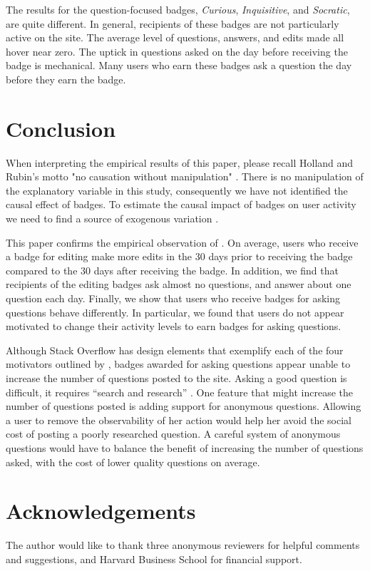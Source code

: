 \documentclass[conference]{IEEEtran}
\newcommand{\1}{\mathds{1}}
\begin{document}
The results for the question-focused badges, \textit{Curious}, \textit{Inquisitive}, and \textit{Socratic}, are quite different. In general, recipients of these badges are not particularly active on the site. The average level of questions, answers, and edits made all hover near zero. The uptick in questions asked on the day before receiving the badge is mechanical. Many users who earn these badges ask a question the day before they earn the badge.

\vspace{0.25in}

\section{Conclusion}

When interpreting the empirical results of this paper, please recall Holland and Rubin's motto "no causation without manipulation" \citep{Holland1986}. There is no manipulation of the explanatory variable in this study, consequently we have not identified the causal effect of badges. To estimate the causal impact of badges on user activity we need to find a source of exogenous variation \citep{Miller2013}.

This paper confirms the empirical observation of \citet{Grant2013}. On average, users who receive a badge for editing make more edits in the 30 days prior to receiving the badge compared to the 30 days after receiving the badge. In addition, we find that recipients of the editing badges ask almost no questions, and answer about one question each day. Finally, we show that users who receive badges for asking questions behave differently. In particular, we found that users do not appear motivated to change their activity levels to earn badges for asking questions.

Although Stack Overflow has design elements that exemplify each of the four motivators outlined by \citet{Grant2013}, badges awarded for asking questions appear unable to increase the number of questions posted to the site. Asking a good question is difficult, it requires ``search and research'' \cite{so-ask}. One feature that might increase the number of questions posted is adding support for anonymous questions. Allowing a user to remove the observability of her action would help her avoid the social cost of posting a poorly researched question. A careful system of anonymous questions would have to balance the benefit of increasing the number of questions asked, with the cost of lower quality questions on average.

\section*{Acknowledgements}

The author would like to thank three anonymous reviewers for helpful comments and suggestions, and Harvard Business School for financial support.

\nocite{MSRChallenge2015}

\renewcommand{\bibfont}{\small}


\end{document}
